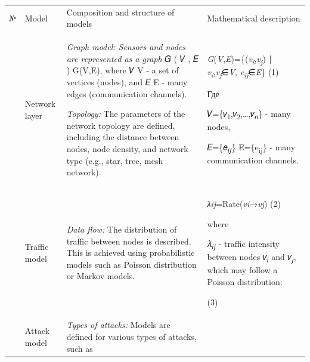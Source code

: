 \begin{longtable}[]{@{}
  >{\raggedright\arraybackslash}p{}
  >{\raggedright\arraybackslash}p{}
  >{\raggedright\arraybackslash}p{}
  >{\raggedright\arraybackslash}p{}@{}}
\toprule\noalign{}
\endhead
\bottomrule\noalign{}
\endlastfoot
№ & Model & Composition and structure of models & Mathematical
description \\
1 & Network layer & \emph{Graph model: Sensors and nodes are represented
as a graph} 𝐺 ( 𝑉 , 𝐸 ) G(V,E), where 𝑉 V - a set of vertices (nodes),
and 𝐸 E - many edges (communication channels).

\emph{Topology:} The parameters of the network topology are defined,
including the distance between nodes, node density, and network type
(e.g., star, tree, mesh network). &
\emph{G}(\emph{V},\emph{E})=\{(\emph{v\textsubscript{i}}\textsubscript{\hspace{0pt}},\emph{v\textsubscript{j}}\hspace{0pt})
∣
\emph{v\textsubscript{i}}\hspace{0pt},\emph{v\textsubscript{j}}\hspace{0pt}∈\emph{V},
\emph{e\textsubscript{ij}}\hspace{0pt}∈\emph{E}\} (1)

Где

𝑉=\{𝑣\textsubscript{1},𝑣\textsubscript{2},\ldots,𝑣\textsubscript{𝑛}\} -
many nodes,

𝐸=\{𝑒\textsubscript{𝑖𝑗}\} E=\{e\textsubscript{ij}\} - many communication
channels. \\
2 & Traffic model & \emph{Data flow:} The distribution of traffic
between nodes is described. This is achieved using probabilistic models
such as Poisson distribution or Markov models. &
\emph{λij}\hspace{0pt}=Rate(\emph{vi}\hspace{0pt}→\emph{vj}\hspace{0pt})
(2)

where

𝜆\textsubscript{𝑖𝑗} - traffic intensity between nodes
𝑣\textsubscript{𝑖}\hspace{0pt} and 𝑣\textsubscript{𝑗}\hspace{0pt}, which
may follow a Poisson distribution:

(3) \\
3 & Attack model & \emph{Types of attacks:} Models are defined for
various types of attacks, such as


\end{longtable}
